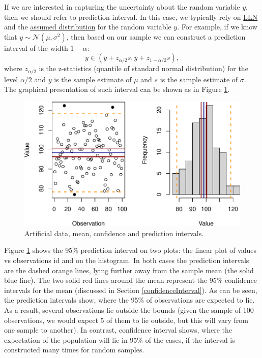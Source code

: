 \documentclass[
]{book}
\theoremstyle{definition}
\theoremstyle{definition}
\theoremstyle{definition}
\theoremstyle{definition}
\theoremstyle{remark}
\begin{document}
If we are interested in capturing the uncertainty about the random variable \(y\), then we should refer to prediction interval. In this case, we typically rely on \protect\hyperlink{LLNandCLT}{LLN} and the \protect\hyperlink{distributions}{assumed distribution} for the random variable \(y\). For example, if we know that \(y \sim \mathcal{N}(\mu, \sigma^2)\), then based on our sample we can construct a prediction interval of the width \(1-\alpha\):
\begin{equation}
    y \in (\bar{y} + z_{\alpha/2} s, \bar{y} + z_{1-\alpha/2} s),
    \label{eq:predictionInterval}
\end{equation}
where \(z_{\alpha/2}\) is the z-statistics (quantile of standard normal distribution) for the level \(\alpha/2\) and \(\bar{y}\) is the sample estimate of \(\mu\) and \(s\) is the sample estimate of \(\sigma\). The graphical presentation of such interval can be shown as in Figure \ref{fig:predictionInterval}.

\begin{figure}
\centering
\includegraphics{Svetunkov---Statistics-for-Business-Analytics_files/figure-latex/predictionInterval-1.pdf}
\caption{\label{fig:predictionInterval}Artificial data, mean, confidence and prediction intervals.}
\end{figure}

Figure \ref{fig:predictionInterval} shows the 95\% prediction interval on two plots: the linear plot of values vs observations id and on the histogram. In both cases the prediction intervals are the dashed orange lines, lying further away from the sample mean (the solid blue line). The two solid red lines around the mean represent the 95\% confidence intervals for the mean (discussed in Section \ref{confidenceInterval}). As can be seen, the prediction intervals show, where the 95\% of observations are expected to lie. As a result, several observations lie outside the bounds (given the sample of 100 observations, we would expect 5 of them to lie outside, but this will vary from one sample to another). In contrast, confidence interval shows, where the expectation of the population will lie in 95\% of the cases, if the interval is constructed many times for random samples.
\end{document}
